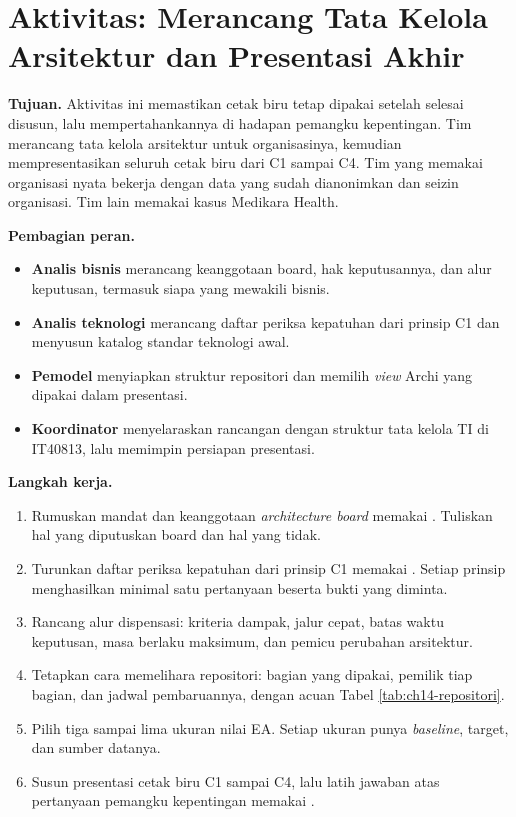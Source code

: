 \section{Aktivitas: Merancang Tata Kelola Arsitektur dan Presentasi Akhir}

\textbf{Tujuan.} Aktivitas ini memastikan cetak biru tetap dipakai setelah
selesai disusun, lalu mempertahankannya di hadapan pemangku kepentingan.
Tim merancang tata kelola arsitektur untuk organisasinya, kemudian
mempresentasikan seluruh cetak biru dari C1 sampai C4. Tim yang memakai
organisasi nyata bekerja dengan data yang sudah dianonimkan dan seizin
organisasi. Tim lain memakai kasus Medikara Health.

\textbf{Pembagian peran.}

\begin{itemize}
  \item \textbf{Analis bisnis} merancang keanggotaan board, hak
        keputusannya, dan alur keputusan, termasuk siapa yang mewakili
        bisnis.
  \item \textbf{Analis teknologi} merancang daftar periksa kepatuhan dari
        prinsip C1 dan menyusun katalog standar teknologi awal.
  \item \textbf{Pemodel} menyiapkan struktur repositori dan memilih
        \textit{view} Archi yang dipakai dalam presentasi.
  \item \textbf{Koordinator} menyelaraskan rancangan dengan struktur tata
        kelola TI di IT40813, lalu memimpin persiapan presentasi.
\end{itemize}

\textbf{Langkah kerja.}

\begin{enumerate}
  \item Rumuskan mandat dan keanggotaan \textit{architecture board} memakai
        .
        Tuliskan hal yang diputuskan board dan hal yang tidak.
  \item Turunkan daftar periksa kepatuhan dari prinsip C1 memakai
        .
        Setiap prinsip menghasilkan minimal satu pertanyaan beserta bukti
        yang diminta.
  \item Rancang alur dispensasi: kriteria dampak, jalur cepat, batas waktu
        keputusan, masa berlaku maksimum, dan pemicu perubahan arsitektur.
  \item Tetapkan cara memelihara repositori: bagian yang dipakai, pemilik
        tiap bagian, dan jadwal pembaruannya, dengan acuan Tabel
        \ref{tab:ch14-repositori}.
  \item Pilih tiga sampai lima ukuran nilai EA. Setiap ukuran punya
        \textit{baseline}, target, dan sumber datanya.
  \item Susun presentasi cetak biru C1 sampai C4, lalu latih jawaban atas
        pertanyaan pemangku kepentingan memakai
        .
\end{enumerate}

